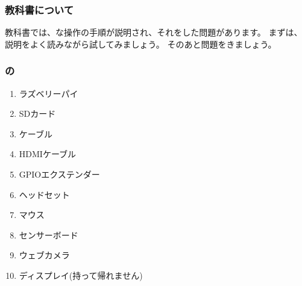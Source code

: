 % 
% 
\subsubsection{教科書について}

教科書では、な操作の手順が説明され、それをした問題があります。
まずは、説明をよく読みながら試してみましょう。
そのあと問題をきましょう。

% 
% 
\subsubsection{の}

\begin{minipage}[b]{0.45\linewidth}
  \begin{enumerate}
    \item ラズベリーパイ
    \item SDカード
    \item {}ケーブル
    \item HDMIケーブル
    \item GPIOエクステンダー
  \end{enumerate}  
\end{minipage}
%
\begin{minipage}[b]{0.45\linewidth}
  \begin{enumerate}
    \setcounter{enumi}{5}
    \item ヘッドセット
    \item マウス
    \item センサーボード
    \item ウェブカメラ
    \item ディスプレイ(持って帰れません)
  \end{enumerate}
\end{minipage}
\bigskip

